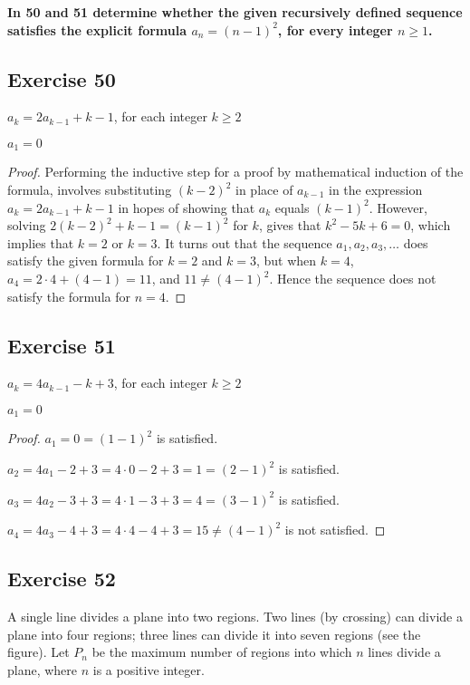\documentclass[14pt]{extarticle}
\newcommand{\cy}{\color{cyan}}
\begin{document}
{\bf \cy In 50 and 51 determine whether the given recursively defined sequence satisfies the explicit formula \(a_n = (n - 1)^2\), for every integer \(n \geq 1\).}

\subsection{Exercise 50}
\(a_k = 2a_{k-1} + k-1\), for each integer \(k \geq 2\)

\(a_1 = 0\)

\begin{proof}
    Performing the inductive step for a proof by mathematical induction of the formula, involves substituting
    \((k - 2)^2\) in place of \(a_{k-1}\) in the expression \(a_k = 2a_{k-1} + k - 1\) in hopes of showing that $a_k$
    equals \((k - 1)^2\). However, solving \(2(k - 2)^2 + k - 1 = (k - 1)^2\) for $k$, gives that \(k^2 - 5k + 6 = 0\),
    which implies that \(k = 2\) or \(k = 3\). It turns out that the sequence \(a_1, a_2, a_3, \ldots\) does satisfy
    the given formula for \(k = 2\) and \(k = 3\), but when \(k = 4\), \(a_4 = 2 \cdot 4 + (4 - 1) = 11\), and
    \(11 \neq (4 - 1)^2\). Hence the sequence does not satisfy the formula for $n = 4$.
\end{proof}

\subsection{Exercise 51}
\(a_k = 4a_{k-1} - k + 3\), for each integer \(k \geq 2\)

\(a_1 = 0\)

\begin{proof}
    \(a_1 = 0 = (1-1)^2\) is satisfied.

    \(a_2 = 4a_1 - 2 + 3 = 4 \cdot 0 - 2 + 3 = 1 = (2-1)^2\) is satisfied.

    \(a_3 = 4a_2 - 3 + 3 = 4 \cdot 1 - 3 + 3 = 4 = (3-1)^2\) is satisfied.

    \(a_4 = 4a_3 - 4 + 3 = 4 \cdot 4 - 4 + 3 = 15 \neq (4-1)^2\) is not satisfied.
\end{proof}

\subsection{Exercise 52}
A single line divides a plane into two regions. Two lines (by crossing) can divide a plane into four regions; three
lines can divide it into seven regions (see the figure). Let $P_n$ be the maximum number of regions into which $n$
lines divide a plane, where $n$ is a positive integer.
\end{document}
